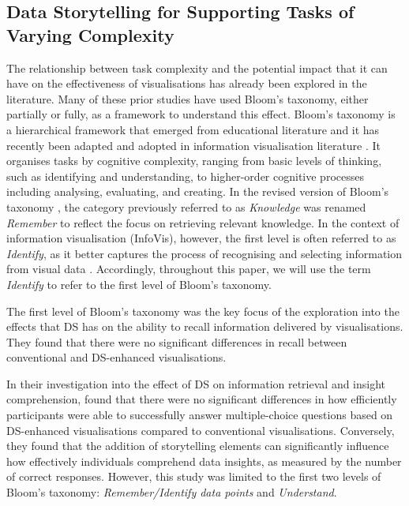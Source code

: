 \subsection{Data Storytelling for Supporting Tasks of Varying Complexity}
The relationship between task complexity and the potential impact that it can have on the effectiveness of visualisations has already been explored in the literature. Many of these prior studies have used Bloom's taxonomy, either partially or fully, as a framework to understand this effect. Bloom's taxonomy is a hierarchical framework that emerged from educational literature \cite{bloom1956} and it has recently been adapted and adopted in information visualisation literature \cite{burns2020evaluate, leerobbins2022learning}. It organises tasks by cognitive complexity, ranging from basic levels of thinking, such as identifying and understanding, to higher-order cognitive processes including analysing, evaluating, and creating. In the revised version of Bloom's taxonomy \cite{krathwohl2002revision}, the category previously referred to as \textit{Knowledge} was renamed \textit{Remember} to reflect the focus on retrieving relevant knowledge. In the context of information visualisation (InfoVis), however, the first level is often referred to as \textit{Identify}, as it better captures the process of recognising and selecting information from visual data \cite{shao2024datastorytelling}. Accordingly, throughout this paper, we will use the term \textit{Identify} to refer to the first level of Bloom's taxonomy.

The first level of Bloom's taxonomy was the key focus of the \citet{zdanovic2022influence} 
exploration into the effects that DS has on the ability to recall information delivered by visualisations. They found that there were no significant differences in recall between conventional and DS-enhanced visualisations.

In their investigation into the effect of DS on information retrieval and insight comprehension, \citet{shao2024datastorytelling} found that there were no significant differences in how efficiently participants were able to successfully answer multiple-choice questions based on DS-enhanced visualisations compared to conventional visualisations. Conversely, they found that the addition of storytelling elements can significantly influence how effectively individuals comprehend data insights, as measured by the number of correct responses. However, this study was limited to the first two levels of Bloom's taxonomy: \textit{Remember/Identify data points} and \textit{Understand}.

